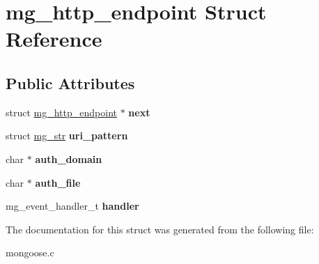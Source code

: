 \hypertarget{structmg__http__endpoint}{}\section{mg\+\_\+http\+\_\+endpoint Struct Reference}
\label{structmg__http__endpoint}
\subsection*{Public Attributes}
\begin{DoxyCompactItemize}
\item 
\mbox{\label{structmg__http__endpoint_a28fd60f7d7ade3f17130287713340ab7}} 
struct \hyperlink{structmg__http__endpoint}{mg\+\_\+http\+\_\+endpoint} $\ast$ {\bfseries next}
\item 
\mbox{\label{structmg__http__endpoint_a72024abf72236a0bd7a529182ce78d36}} 
struct \hyperlink{structmg__str}{mg\+\_\+str} {\bfseries uri\+\_\+pattern}
\item 
\mbox{\label{structmg__http__endpoint_a19a0e4a59560c9d0b02eaf9d91f50738}} 
char $\ast$ {\bfseries auth\+\_\+domain}
\item 
\mbox{\label{structmg__http__endpoint_ac54f73eec84df2b4caeb729e9a8fb56e}} 
char $\ast$ {\bfseries auth\+\_\+file}
\item 
\mbox{\label{structmg__http__endpoint_a24176c5ff8bb9ffb89a8f553e8e066e0}} 
mg\+\_\+event\+\_\+handler\+\_\+t {\bfseries handler}
\end{DoxyCompactItemize}


The documentation for this struct was generated from the following file\+:\begin{DoxyCompactItemize}
\item 
mongoose.\+c\end{DoxyCompactItemize}
